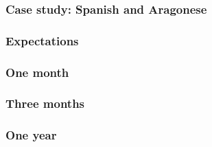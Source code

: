 \documentclass{beamer} %
\begin{document}
\begin{frame}
  \frametitle{Case study: Spanish and Aragonese}

\end{frame}



\begin{frame}
  \frametitle{Expectations}

\end{frame}

\begin{frame}
  \frametitle{One month}

\end{frame}

\begin{frame}
  \frametitle{Three months}

\end{frame}

\begin{frame}
  \frametitle{One year}

\end{frame}
\end{document}
